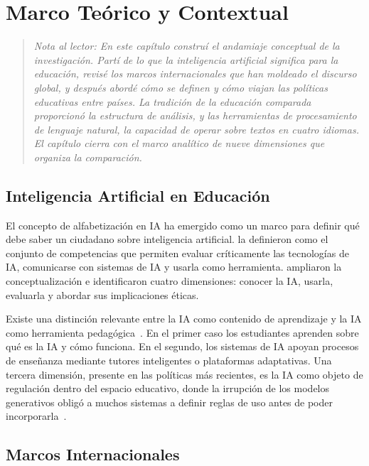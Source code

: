 
\chapter{Marco Teórico y Contextual}
\label{cap:marco-teorico}

\begin{quote}\small\textit{
Nota al lector: En este capítulo construí el andamiaje conceptual de la investigación. Partí de lo que la inteligencia artificial significa para la educación, revisé los marcos internacionales que han moldeado el discurso global, y después abordé cómo se definen y cómo viajan las políticas educativas entre países. La tradición de la educación comparada proporcionó la estructura de análisis, y las herramientas de procesamiento de lenguaje natural, la capacidad de operar sobre textos en cuatro idiomas. El capítulo cierra con el marco analítico de nueve dimensiones que organiza la comparación.
}\end{quote}


\section{Inteligencia Artificial en Educación}

El concepto de alfabetización en IA ha emergido como un marco para definir qué debe saber un ciudadano sobre inteligencia artificial. \citet{long2020ailiteracy} la definieron como el conjunto de competencias que permiten evaluar críticamente las tecnologías de IA, comunicarse con sistemas de IA y usarla como herramienta. \citet{ng2021ailiteracy} ampliaron la conceptualización e identificaron cuatro dimensiones: conocer la IA, usarla, evaluarla y abordar sus implicaciones éticas.

Existe una distinción relevante entre la IA como contenido de aprendizaje y la IA como herramienta pedagógica~\citep{holmes2019aied}. En el primer caso los estudiantes aprenden sobre qué es la IA y cómo funciona. En el segundo, los sistemas de IA apoyan procesos de enseñanza mediante tutores inteligentes o plataformas adaptativas. Una tercera dimensión, presente en las políticas más recientes, es la IA como objeto de regulación dentro del espacio educativo, donde la irrupción de los modelos generativos obligó a muchos sistemas a definir reglas de uso antes de poder incorporarla~\citep{unesco2023genai}.


\section{Marcos Internacionales}

